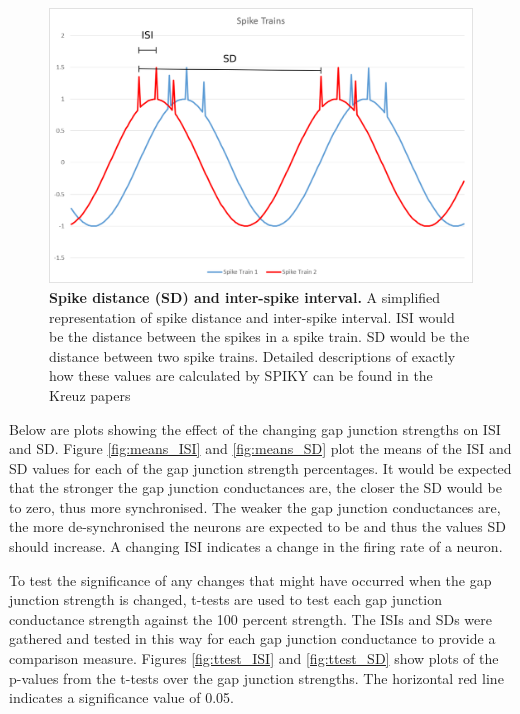 \begin{figure}[H]
	\begin{center}
		\includegraphics[width=\columnwidth]{graphics/SpikeDistance.png}
		\caption[Spike distance (SD) and inter-spike interval.]{\textbf{Spike distance (SD) and inter-spike interval.} A simplified representation of spike distance and inter-spike interval. ISI would be the distance between the spikes in a spike train. SD would be the distance between two spike trains. Detailed descriptions of exactly how these values are calculated by SPIKY can be found in the Kreuz papers \cite{Kreuz2007, Kreuz2009, Kreuz2011, Kreuz2013}}
		\label{fig:SpikeDistance}
	\end{center}
\end{figure}


Below are plots showing the effect of the changing gap junction strengths on \ac{ISI} and \ac{SD}. Figure \ref{fig:means_ISI} and \ref{fig:means_SD} plot the means of the \ac{ISI} and \ac{SD} values for each of the gap junction strength percentages. It would be expected that the stronger the gap junction conductances are, the closer the \ac{SD} would be to zero, thus more synchronised. The weaker the gap junction conductances are, the more de-synchronised the neurons are expected to be and thus the values \ac{SD} should increase. A changing \ac{ISI} indicates a change in the firing rate of a neuron.

To test the significance of any changes that might have occurred when the gap junction strength is changed, t-tests are used to test each gap junction conductance strength against the 100 percent strength. The \acp{ISI} and \acp{SD} were gathered and tested in this way for each gap junction conductance to provide a comparison measure. Figures \ref{fig:ttest_ISI} and \ref{fig:ttest_SD} show plots of the p-values from the t-tests over the gap junction strengths. The horizontal red line indicates a significance value of 0.05.

